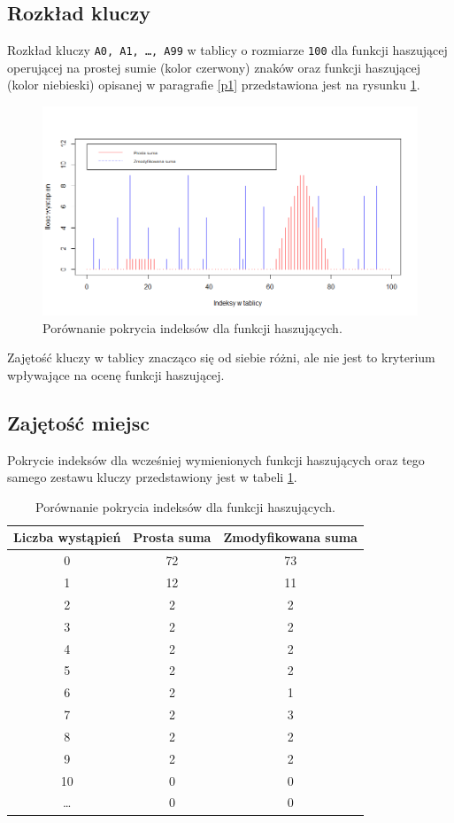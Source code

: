 \documentclass{article}
\begin{document}
	\subsection{Rozkład kluczy}
	Rozkład kluczy \texttt{A0, A1, \ldots, A99} w tablicy o rozmiarze \texttt{100} dla funkcji haszującej operującej na prostej sumie (kolor czerwony) znaków oraz funkcji haszującej (kolor niebieski) opisanej w paragrafie \ref{p1} przedstawiona jest na rysunku \ref{r1}.	
		\begin{figure}[h] 
			\includegraphics[width=160mm]{porownanie.png}
			\caption{Porównanie pokrycia indeksów dla funkcji haszujących.}
			\label{r1}
		\end{figure}
		
	Zajętość kluczy w tablicy znacząco się od siebie różni, ale nie jest to kryterium wpływające na ocenę funkcji haszującej.
	\clearpage
	\subsection{Zajętość miejsc}
	Pokrycie indeksów dla wcześniej wymienionych funkcji haszujących oraz tego samego zestawu kluczy przedstawiony jest w tabeli \ref{t1}.
	
	\begin{table}[!h]
		\centering		
		\caption{Porównanie pokrycia indeksów dla funkcji haszujących.}
		\begin{tabular}{|c|c|c|}
			\hline
			\textbf{Liczba wystąpień} & \textbf{Prosta suma} & \textbf{Zmodyfikowana suma} \\\hline\hline 
			0 &72 &73 \\\hline  
			1 &12 &11 \\\hline 
			2 &2&2 \\\hline 
			3 &2 &2 \\\hline 
			4 &2 &2 \\\hline 
			5 &2 &2 \\\hline 
			6 &2 &1 \\\hline 
			7 &2 &3 \\\hline 
			8 &2 &2 \\\hline 
			9 &2 &2 \\\hline 
			10 &0 &0 \\\hline 
			\ldots &0 &0 \\\hline 			
		\end{tabular} 
		\label{t1}
	\end{table} 
	
\end{document}
